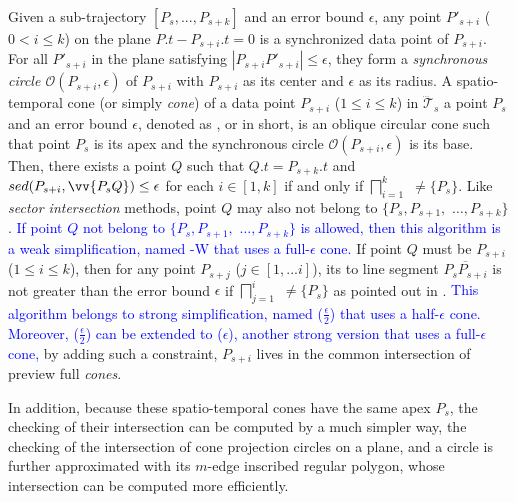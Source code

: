 Given a sub-trajectory $[P_s,...,P_{s+k}]$ and an error bound $\epsilon$, any point $P'_{s+i}$ ($0< i \le k$) on the plane $P.t-P_{s+i}.t = 0$ is a synchronized data point of $P_{s+i}$. For all $P'_{s+i}$ in the plane satisfying $|P_{s+i}P'_{s+i}| \le \epsilon$, they form a \textit{synchronous circle $\mathcal{O}(P_{s+i}, \epsilon)$} of $P_{s+i}$ with $P_{s+i}$ as its center and $\epsilon$ as its radius.
%
A spatio-temporal cone (or simply \textit{cone}) of a data point $P_{s+i}$ ($1\le i\le k$) in $\dddot{\mathcal{T}}_s$ \wrt a point $P_s$ and an error bound $\epsilon$, denoted as , or  in short, is an oblique circular cone such that point $P_s$ is its apex and the synchronous circle $\mathcal{O}(P_{s+i}, \epsilon)$ is its base.
%
Then, there exists a point $Q$ such that $Q.t = P_{s+k}.t$ and $sed(P_{s+i}, \vv{P_sQ})\le \epsilon$ for each $i \in [1,k]$ if and only if $\bigsqcap_{i=1}^{k}$ $\ne \{P_s\}$.
%
Like \textit{sector intersection} methods, point $Q$ may also not belong to $\{P_{s}, P_{s+1},$ $\ldots, P_{s+k}\}$. 
\textcolor{blue}{If point $Q$ not belong to $\{P_{s}, P_{s+1},$ $\ldots, P_{s+k}\}$ is allowed, then this algorithm is a weak simplification, named \cised-W that uses a full-$\epsilon$ cone.}
If point $Q$ must be $P_{s+i}$ ($1\le i\le k$), then for any point $P_{s+j}$ ($j \in [1, ... i]$), its \sed to line segment $\overline{P_sP_{s+i}}$ is not greater than the error bound $\epsilon$ if
$\bigsqcap_{j=1}^{i}$ $\ne \{P_s\}$ as pointed out in \cite{Lin:Cised}. 
\textcolor{blue}{This algorithm belongs to strong simplification, named \cised($\frac{\epsilon}{2}$) that uses a half-$\epsilon$ cone.}
\textcolor{blue}{Moreover, \cised($\frac{\epsilon}{2}$) can be extended to \cised(${\epsilon}$), another strong version that uses a full-${\epsilon}$ cone,} by adding such a constraint, \ie $P_{s+i}$ lives in the common intersection of preview full \emph{cones}.

In addition, because these spatio-temporal cones have the same apex $P_s$, the checking of their intersection can be computed by a much simpler way, \ie the checking of the intersection of cone projection circles on a plane, and a circle is further approximated with its $m$-edge inscribed regular polygon, whose intersection can be computed more efficiently. %




